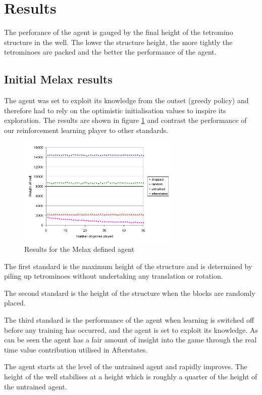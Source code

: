 \documentclass{rucsthesis}
\begin{document}
\section{Results}

The perforance of the agent is gauged by the final height of the tetromino structure in the well. The lower the structure height, the more tightly the tetrominoes are packed and the better the performance of the agent.

\subsection{Initial Melax results}

The agent was set to exploit its knowledge from the outset (greedy policy) and therefore had to rely on the optimistic initialisation values to inspire its exploration. The results are shown in figure \ref{fig:mymelaxresults} and contrast the performance of our reinforcement learning player to other standards. 

\begin{figure}[h]
\centering
\includegraphics[width=3in]{mymelaxresults.png}
\caption{Results for the Melax defined agent}
\label{fig:mymelaxresults}
\end{figure}

The first standard is the maximum height of the structure and is determined by piling up tetrominoes without undertaking any translation or rotation.

The second standard is the height of the structure when the blocks are randomly placed.

The third standard is the performance of the agent when learning is switched off before any training has occurred, and the agent is set to exploit its knowledge. As can be seen the agent has a fair amount of insight into the game through the real time value contribution utilised in Afterstates. 

The agent starts at the level of the untrained agent and rapidly improves. The height of the well stabilises at a height which is roughly a quarter of the height of the untrained agent.
\end{document}
